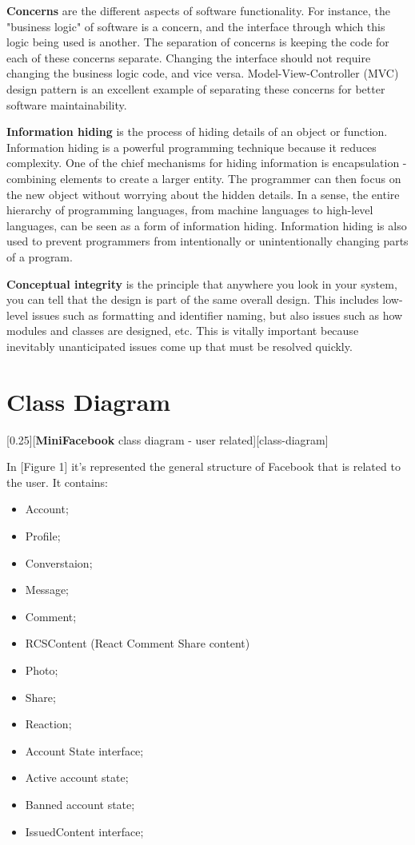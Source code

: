 \documentclass{article}
\begin{document}
			\bigskip
			\textbf{Concerns} are the different aspects of software functionality. For instance, the "business logic" of software is a concern, and the interface through which this logic being used is another. The separation of concerns is keeping the code for each of these concerns separate. Changing the interface should not require changing the business logic code, and vice versa. Model-View-Controller (MVC) design pattern is an excellent example of separating these concerns for better software maintainability.

			\bigskip
			\textbf{Information hiding} is the process of hiding details of an object or function. Information hiding is a powerful programming technique because it reduces complexity. One of the chief mechanisms for hiding information is encapsulation - combining elements to create a larger entity. The programmer can then focus on the new object without worrying about the hidden details. In a sense, the entire hierarchy of programming languages, from machine languages to high-level languages, can be seen as a form of information hiding. Information hiding is also used to prevent programmers from intentionally or unintentionally changing parts of a program.

			\bigskip
			\textbf{Conceptual integrity} is the principle that anywhere you look in your system, you can tell that the design is part of the same overall design. This includes low-level issues such as formatting and identifier naming, but also issues such as how modules and classes are designed, etc. This is vitally important because inevitably unanticipated issues come up that must be resolved quickly.

	\section{Class Diagram}
		[\textbf{MiniFacebook} class diagram - user related][class-diagram]

		In [Figure 1] it's represented the general structure of Facebook that is related to the user. It contains:
		\begin{itemize}
			\item Account;
			\item Profile;
			\item Converstaion;
			\item Message;
			\item Comment;
			\item RCSContent (React Comment Share content)
			\item Photo;
			\item Share;
			\item Reaction;
			\item Account State interface;
			\item Active account state;
			\item Banned account state;
			\item IssuedContent interface;
		\end{itemize}
\end{document}
